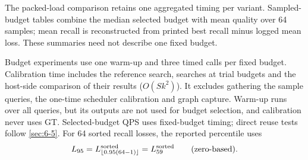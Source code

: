 The packed-load comparison retains one aggregated timing per variant.
Sampled-budget tables combine the median selected budget with mean quality
over 64 samples; mean recall is reconstructed from printed best recall
minus logged mean loss. These summaries need not describe one fixed budget.

\label{sec:a-budget-contract}
\label{sec:a-supplement}
\label{sec:a-t4-t5}
Budget experiments use one warm-up and three timed calls per fixed
budget. Calibration time includes the reference search, searches at trial
budgets and the host-side comparison of their results ($O(Sk^2)$). It
excludes gathering the sample queries, the one-time scheduler calibration
and graph capture. Warm-up runs over all queries, but its outputs are
not used for budget selection, and calibration never uses GT. Selected-budget QPS uses fixed-budget timing; direct
reuse tests follow \cref{sec:6-5}. For 64 sorted recall losses, the
reported percentile uses
\[
 L_{95}=L^{\rm sorted}_{\lfloor0.95(64-1)\rfloor}
       =L^{\rm sorted}_{59}\qquad\text{(zero-based)}.
\]
